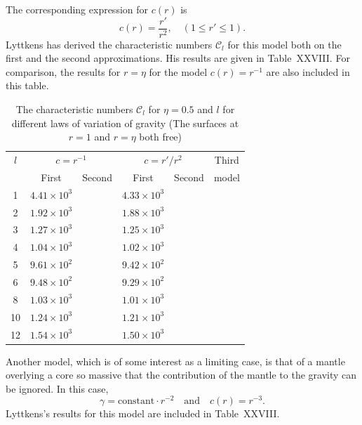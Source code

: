 
The corresponding expression for $c(r)$ is
\begin{equation}\label{eq:6-194}
c(r) = \frac{r'}{r^2},\quad (1 \leq r' \leq 1).
\end{equation}
Lyttkens has derived the characteristic numbers $\mathcal{C}_l$ for this model both
on the first and the second approximations. His results are given in
Table~XXVIII. For comparison, the results for $r = \eta$ for the model
$c(r) = r^{-1}$ are also included in this table.

\begin{table}[ht]
\centering
\caption{The characteristic numbers $\mathcal{C}_l$ for $\eta = 0.5$ and $l$ for different laws of variation
of gravity\newline
(The surfaces at $r = 1$ and $r = \eta$ both free)}
\label{tab:XXVIII}
\begin{tabular}{c c c c c c}
\hline
$l$ & \multicolumn{2}{c}{$c = r^{-1}$} & \multicolumn{2}{c}{$c = r'/r^2$} & Third \\
 & First & Second & First & Second & model \\
\hline
1 & $4.41\times 10^3$ & & $4.33\times 10^3$ & & \\
2 & $1.92\times 10^3$ & & $1.88\times 10^3$ & & \\
3 & $1.27\times 10^3$ & & $1.25\times 10^3$ & & \\
4 & $1.04\times 10^3$ & & $1.02\times 10^3$ & & \\
5 & $9.61\times 10^2$ & & $9.42\times 10^2$ & & \\
6 & $9.48\times 10^2$ & & $9.29\times 10^2$ & & \\
8 & $1.03\times 10^3$ & & $1.01\times 10^3$ & & \\
10 & $1.24\times 10^3$ & & $1.21\times 10^3$ & & \\
12 & $1.54\times 10^3$ & & $1.50\times 10^3$ & & \\
\hline
\end{tabular}
\end{table}

Another model, which is of some interest as a limiting case, is that of a
mantle overlying a core so massive that the contribution of the mantle
to the gravity can be ignored. In this case,
\begin{equation}\label{eq:6-195}
\gamma = \text{constant}\cdot r^{-2} \quad\text{and}\quad c(r) = r^{-3}.
\end{equation}
Lyttkens's results for this model are included in Table~XXVIII.

